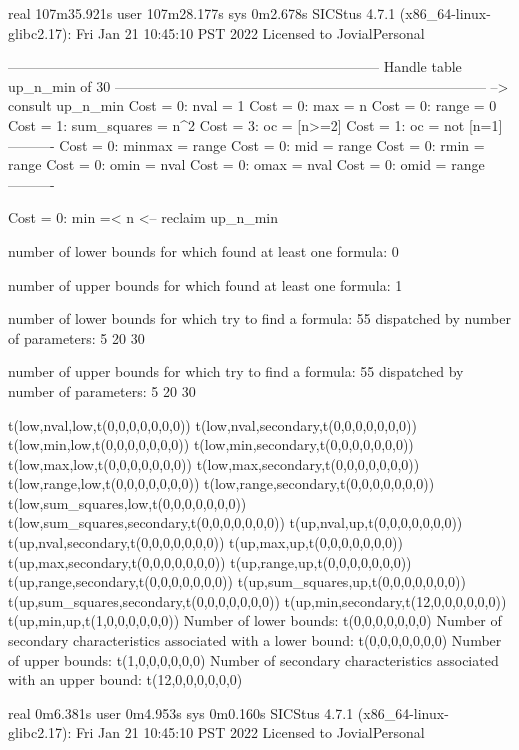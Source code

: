 real	107m35.921s
user	107m28.177s
sys	0m2.678s
SICStus 4.7.1 (x86_64-linux-glibc2.17): Fri Jan 21 10:45:10 PST 2022
Licensed to JovialPersonal


--------------------------------------------------------------------------------
Handle table up_n_min of 30
--------------------------------------------------------------------------------
--> consult up_n_min
Cost =  0:  nval        = 1
Cost =  0:  max         = n
Cost =  0:  range       = 0
Cost =  1:  sum_squares = n^2
Cost =  3:  oc          = [n>=2]
Cost =  1:  oc          = not [n=1]
----------
Cost =  0:  minmax      = range
Cost =  0:  mid         = range
Cost =  0:  rmin        = range
Cost =  0:  omin        = nval
Cost =  0:  omax        = nval
Cost =  0:  omid        = range
----------

Cost =  0:  min =< n
<-- reclaim up_n_min

number of lower bounds for which found at least one formula: 0

number of upper bounds for which found at least one formula: 1

number of lower bounds for which try to find a formula: 55
dispatched by number of parameters: 5  20  30

number of upper bounds for which try to find a formula: 55
dispatched by number of parameters: 5  20  30

t(low,nval,low,t(0,0,0,0,0,0,0))
t(low,nval,secondary,t(0,0,0,0,0,0,0))
t(low,min,low,t(0,0,0,0,0,0,0))
t(low,min,secondary,t(0,0,0,0,0,0,0))
t(low,max,low,t(0,0,0,0,0,0,0))
t(low,max,secondary,t(0,0,0,0,0,0,0))
t(low,range,low,t(0,0,0,0,0,0,0))
t(low,range,secondary,t(0,0,0,0,0,0,0))
t(low,sum_squares,low,t(0,0,0,0,0,0,0))
t(low,sum_squares,secondary,t(0,0,0,0,0,0,0))
t(up,nval,up,t(0,0,0,0,0,0,0))
t(up,nval,secondary,t(0,0,0,0,0,0,0))
t(up,max,up,t(0,0,0,0,0,0,0))
t(up,max,secondary,t(0,0,0,0,0,0,0))
t(up,range,up,t(0,0,0,0,0,0,0))
t(up,range,secondary,t(0,0,0,0,0,0,0))
t(up,sum_squares,up,t(0,0,0,0,0,0,0))
t(up,sum_squares,secondary,t(0,0,0,0,0,0,0))
t(up,min,secondary,t(12,0,0,0,0,0,0))
t(up,min,up,t(1,0,0,0,0,0,0))
Number of lower bounds:                                             t(0,0,0,0,0,0,0)
Number of secondary characteristics associated with a lower bound:  t(0,0,0,0,0,0,0)
Number of upper bounds:                                             t(1,0,0,0,0,0,0)
Number of secondary characteristics associated with an upper bound: t(12,0,0,0,0,0,0)

real	0m6.381s
user	0m4.953s
sys	0m0.160s
SICStus 4.7.1 (x86_64-linux-glibc2.17): Fri Jan 21 10:45:10 PST 2022
Licensed to JovialPersonal


